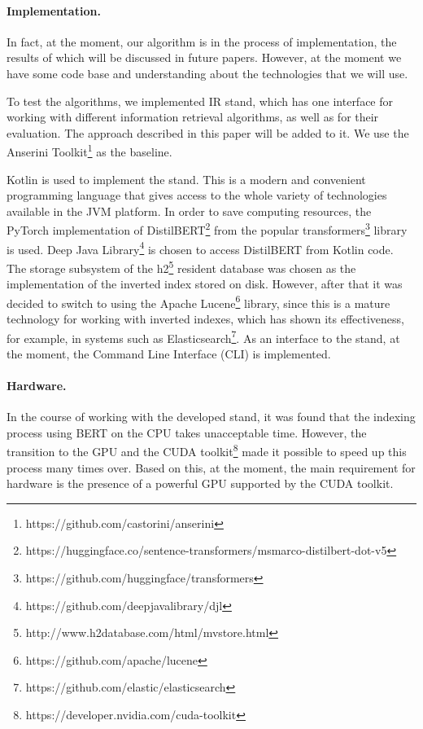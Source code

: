 \documentclass[
    twocolumn,
]{template/ceurart}
\begin{document}
    \paragraph{Implementation.}
    In fact, at the moment, our algorithm is in the process of implementation,
    the results of which will be discussed in future papers.
    However, at the moment we have some code base and understanding about the technologies that we will use.

    To test the algorithms, we implemented IR stand, which has one interface for working
    with different information retrieval algorithms, as well as for their evaluation.
    The approach described in this paper will be added to it.
    We use the Anserini Toolkit\footnote{https://github.com/castorini/anserini} as the baseline.

    Kotlin is used to implement the stand.
    This is a modern and convenient programming language that gives access
    to the whole variety of technologies available in the JVM platform.
    In order to save computing resources, the PyTorch implementation
    of DistilBERT\footnote{https://huggingface.co/sentence-transformers/msmarco-distilbert-dot-v5}
    from the popular transformers\footnote{https://github.com/huggingface/transformers} library is used.
    Deep Java Library\footnote{https://github.com/deepjavalibrary/djl} is chosen to access DistilBERT from Kotlin code.
    The storage subsystem of the h2\footnote{http://www.h2database.com/html/mvstore.html} resident database
    was chosen as the implementation of the inverted index stored on disk.
    However, after that it was decided to switch to using the Apache Lucene\footnote{https://github.com/apache/lucene}
    library, since this is a mature technology for working with inverted indexes,
    which has shown its effectiveness, for example, in systems such
    as Elasticsearch\footnote{https://github.com/elastic/elasticsearch}.
    As an interface to the stand, at the moment, the Command Line Interface (CLI) is implemented.

    \paragraph{Hardware.}
    In the course of working with the developed stand, it was found that the indexing process using BERT
    on the CPU takes unacceptable time.
    However, the transition to the GPU and the CUDA toolkit\footnote{https://developer.nvidia.com/cuda-toolkit}
    made it possible to speed up this process many times over.
    Based on this, at the moment, the main requirement for hardware is the presence
    of a powerful GPU supported by the CUDA toolkit.
\end{document}
